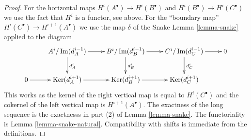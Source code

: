\documentclass[10pt,a4paper]{amsart}
\theoremstyle{plain}
\theoremstyle{definition}
\theoremstyle{remark}
\numberwithin{equation}{subsection}
\def\Ker{\mathop{\mathrm{Ker}}}
\def\Im{\mathop{\mathrm{Im}}}
\begin{document}
\begin{proof}
For the horizontal maps $H^i(A^\bullet) \to H^i(B^\bullet)$ and
$H^i(B^\bullet) \to H^i(C^\bullet)$ we use the fact that $H^i$
is a functor, see above. For the ``boundary map''
$H^i(C^\bullet) \to H^{i + 1}(A^\bullet)$ we use the map $\delta$
of the Snake Lemma \ref{lemma-snake}
applied to the diagram
$$
\xymatrix{
&
A^i/\Im(d_A^{i - 1}) \ar[r] \ar[d]^{d_A^i} &
B^i/\Im(d_B^{i - 1}) \ar[r] \ar[d]^{d_B^i} &
C^i/\Im(d_C^{i - 1}) \ar[r] \ar[d]^{d_C^i} &
0 \\
0 \ar[r] &
\Ker(d_A^{i + 1}) \ar[r] &
\Ker(d_B^{i + 1}) \ar[r] &
\Ker(d_C^{i + 1}) &
}
$$
This works as the kernel of the right vertical map is equal to
$H^i(C^\bullet)$ and the cokernel of the left vertical map is
$H^{i + 1}(A^\bullet)$. The exactness of the long sequence is
the exactnesss in part (2) of Lemma \ref{lemma-snake}.
The functoriality is Lemma \ref{lemma-snake-natural}. Compatibility
with shifts is immediate from the definitions.
\end{proof}
\end{document}
